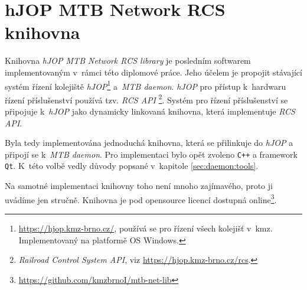 \newpage
\section{hJOP MTB Network RCS knihovna} \label{sec:mtb-net-lib}

Knihovna \textit{hJOP MTB Network RCS library} je posledním softwarem implementovaným
v~rámci této diplomové práce. Jeho účelem je propojit stávající systém řízení
kolejiště \textit{hJOP}\footnote{\url{https://hjop.kmz-brno.cz/}, používá se
pro řízení všech kolejišť v~\gls{kmz}. Implementovaný na platformě OS Windows.}
a~\textit{MTB daemon}. \textit{hJOP} pro přístup k~hardwaru řízení
příslušenství používá tzv. \textit{RCS API} \footnote{\textit{Railroad Control
System API}, viz \url{https://hjop.kmz-brno.cz/rcs}.}. Systém pro řízení
příslušenství se připojuje k~\textit{hJOP} jako dynamicky linkovaná knihovna,
která implementuje \textit{RCS API}.

Byla tedy implementována jednoduchá knihovna, která se přilinkuje do
\textit{hJOP} a připojí se k~\textit{MTB daemon}. Pro implementaci bylo
opět zvoleno \texttt{C++} a framework \texttt{Qt}. K~této volbě vedly důvody
popsané v~kapitole \ref{sec:daemon:tools}.

Na samotné implementaci knihovny toho není mnoho zajímavého, proto ji uvádíme
jen stručně. Knihovna je pod opensource licencí dostupná
online\footnote{\url{https://github.com/kmzbrnoI/mtb-net-lib}}.
